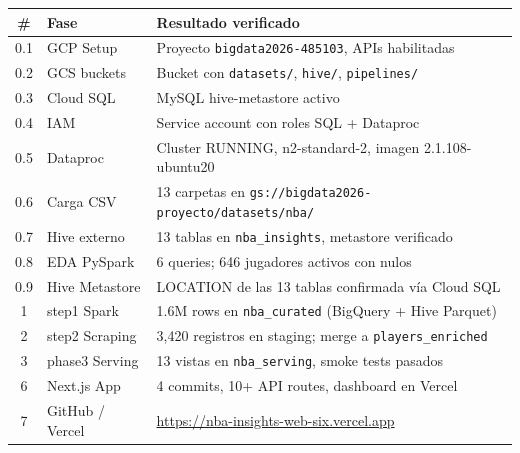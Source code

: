 \documentclass[12pt, letterpaper]{article}
\begin{document}
\begin{tcolorbox}[infostyle, title={Pipeline de extremo a extremo — estado final}]
\begin{tabular}{@{}clp{8cm}@{}}
\toprule
\textbf{\#} & \textbf{Fase} & \textbf{Resultado verificado} \\
\midrule
0.1 & GCP Setup        & Proyecto \texttt{bigdata2026-485103}, APIs habilitadas \\
0.2 & GCS buckets      & Bucket con \texttt{datasets/}, \texttt{hive/}, \texttt{pipelines/} \\
0.3 & Cloud SQL        & MySQL hive-metastore activo \\
0.4 & IAM              & Service account con roles SQL + Dataproc \\
0.5 & Dataproc         & Cluster RUNNING, n2-standard-2, imagen 2.1.108-ubuntu20 \\
0.6 & Carga CSV        & 13 carpetas en \texttt{gs://bigdata2026-proyecto/datasets/nba/} \\
0.7 & Hive externo     & 13 tablas en \texttt{nba\_insights}, metastore verificado \\
0.8 & EDA PySpark      & 6 queries; 646 jugadores activos con nulos \\
0.9 & Hive Metastore   & LOCATION de las 13 tablas confirmada vía Cloud SQL \\
1   & step1 Spark      & 1.6M rows en \texttt{nba\_curated} (BigQuery + Hive Parquet) \\
2   & step2 Scraping   & 3,420 registros en staging; merge a \texttt{players\_enriched} \\
3   & phase3 Serving   & 13 vistas en \texttt{nba\_serving}, smoke tests pasados \\
6   & Next.js App      & 4 commits, 10+ API routes, dashboard en Vercel \\
7   & GitHub / Vercel  & \url{https://nba-insights-web-six.vercel.app} \\
\bottomrule
\end{tabular}
\end{tcolorbox}
\end{document}
